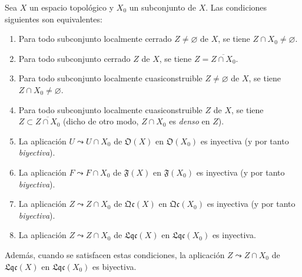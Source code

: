 \begin{proposition}[10.1.2]
\label{IV.10.1.2}
Sea $X$ un espacio topológico y $X_0$ un subconjunto de $X$.
Las condiciones siguientes son equivalentes:
\begin{enumerate}[label=\emph{\alph*)}]
  \item Para todo subconjunto localmente cerrado $Z\neq\varnothing$ de $X$, se tiene $Z\cap X_0\neq\varnothing$.
  \item[\rm a$'$)] Para todo subconjunto cerrado $Z$ de $X$, se tiene $Z=\overline{Z\cap X_0}$.
  \item Para todo subconjunto localmente cuasiconstruible $Z\neq\varnothing$ de $X$, se tiene $Z\cap X_0\neq\varnothing$.
  \item[\rm b$'$)] Para todo subconjunto localmente cuasiconstruible $Z$ de $X$, se tiene $Z\subset\overline{Z\cap X_0}$ \textup{(dicho de otro modo, $Z\cap X_0$ es \emph{denso} en $Z$)}.
  \item La aplicación $U\leadsto U\cap X_0$ de $\mathfrak{O}(X)$ en $\mathfrak{O}(X_0)$ es inyectiva \textup{(y por tanto \emph{biyectiva})}.
  \item[\rm c$'$)] La aplicación $F\leadsto F\cap X_0$ de $\mathfrak{F}(X)$ en $\mathfrak{F}(X_0)$ es inyectiva \textup{(y por tanto \emph{biyectiva})}.
  \item[\rm c$''$)] La aplicación $Z\leadsto Z\cap X_0$ de $\mathfrak{Qc}(X)$ en $\mathfrak{Qc}(X_0)$ es inyectiva \textup{(y por tanto \emph{biyectiva})}.
  \item[\rm c$'''$)] La aplicación $Z\leadsto Z\cap X_0$ de $\mathfrak{Lqc}(X)$ en $\mathfrak{Lqc}(X_0)$ es inyectiva.
\end{enumerate}
Además, cuando se satisfacen estas condiciones, la aplicación $Z\leadsto Z\cap X_0$ de $\mathfrak{Lqc}(X)$ en $\mathfrak{Lqc}(X_0)$ es biyectiva.
\end{proposition}

